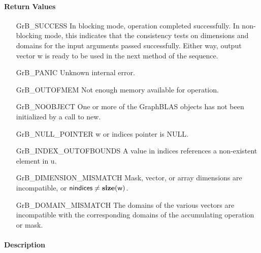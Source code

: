 \paragraph{Return Values}

\begin{itemize}[leftmargin=2.1in]
    \item[{\sf GrB\_SUCCESS}]         In blocking mode, operation
	completed successfully. In non-blocking mode, this indicates
	that the consistency tests on dimensions and domains for the
	input arguments passed successfully. Either way, output vector
	{\sf w} is ready to be used in the next method of the sequence.

    \item[{\sf GrB\_PANIC}]           Unknown internal error.
    
    \item[{\sf GrB\_OUTOFMEM}]        Not enough memory available for operation.
    
    \item[{\sf GrB\_NOOBJECT}]        One or more of the GraphBLAS objects has
    not been initialized by a call to {\sf new}.
    
    \item[{\sf GrB\_NULL\_POINTER}]  {\sf w} or {\sf indices} pointer is {\sf NULL}.

    \item[{\sf GrB\_INDEX\_OUTOFBOUNDS}]  A value in {\sf indices} references a 
    non-existent element in {\sf u}.
    
    \item[{\sf GrB\_DIMENSION\_MISMATCH}] Mask, vector, or array dimensions are
    incompatible, or ${\sf nindices} \neq \bold{size}({\sf w})$. 
    
    \item[{\sf GrB\_DOMAIN\_MISMATCH}]    The domains of the various
	vectors are incompatible with the corresponding domains of the
	accumulating operation or mask.
\end{itemize}

\paragraph{Description}

